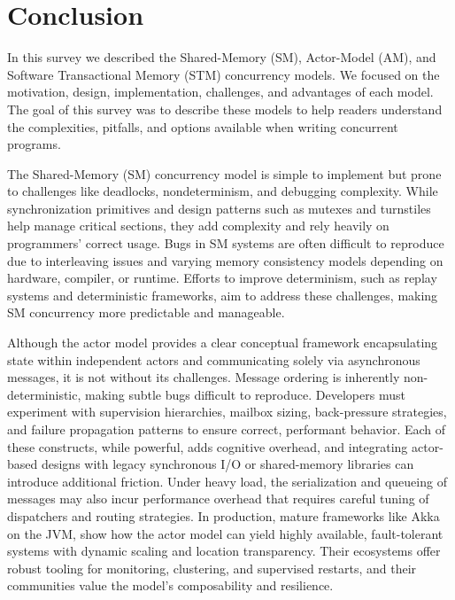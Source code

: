 \section{Conclusion\label{sec:conclusion}}
In this survey we described the Shared-Memory (SM),
Actor-Model (AM), and Software Transactional Memory (STM)
concurrency models. We focused on
the motivation, design, implementation, challenges,
and advantages of each model. The goal of this survey
was to describe these models to help readers
understand the complexities, pitfalls, and options
available when writing concurrent programs.

The Shared-Memory (SM) concurrency model
is simple to implement but prone to challenges like deadlocks,
nondeterminism, and debugging complexity.
While synchronization primitives and design patterns
such as mutexes and turnstiles help manage critical sections,
they add complexity and rely heavily on programmers' correct usage.
Bugs in SM systems are often difficult to reproduce due to
interleaving issues and varying memory consistency models
depending on hardware, compiler, or runtime.
Efforts to improve determinism, such as replay systems and
deterministic frameworks, aim to address these challenges,
making SM concurrency more predictable and manageable.

Although the actor model provides a clear conceptual framework encapsulating state 
within independent actors and communicating solely via asynchronous messages, 
it is not without its challenges. Message ordering is inherently 
non-deterministic, making subtle bugs difficult to reproduce. 
Developers must experiment with supervision hierarchies, 
mailbox sizing, back-pressure strategies, and failure propagation 
patterns to ensure correct, performant behavior. Each of these 
constructs, while powerful, adds cognitive overhead, and integrating 
actor-based designs with legacy synchronous I/O or shared-memory libraries 
can introduce additional friction. Under heavy load, the serialization and 
queueing of messages may also incur performance overhead that requires careful 
tuning of dispatchers and routing strategies. In production, mature frameworks 
like Akka on the JVM, show how the actor model can yield highly available, 
fault-tolerant systems with dynamic scaling and location transparency. Their 
ecosystems offer robust tooling for monitoring, clustering, and supervised 
restarts, and their communities value the model’s composability and resilience.

